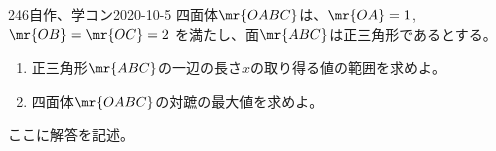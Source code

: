 \begin{prob}{246}{}{自作、学コン2020-10-5}
 四面体$\mr{OABC}$は、$\mr{OA}=1$, $\mr{OB}=\mr{OC}=2$ を満たし、面$\mr{ABC}$は正三角形であるとする。
 \begin{enumerate}
  \item 正三角形$\mr{ABC}$の一辺の長さ$x$の取り得る値の範囲を求めよ。
  \item 四面体$\mr{OABC}$の対蹠の最大値を求めよ。
 \end{enumerate}
\end{prob}
ここに解答を記述。